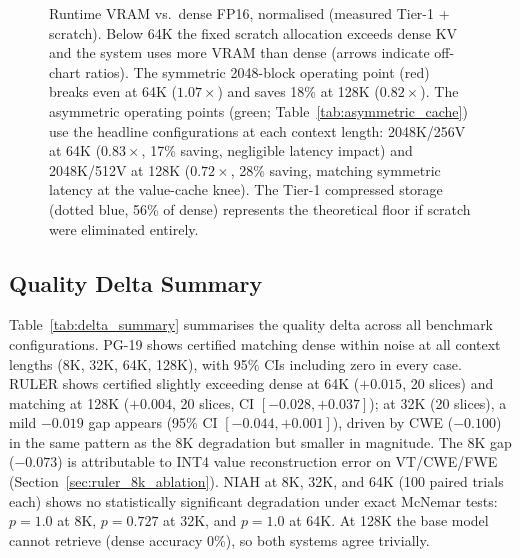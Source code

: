 \documentclass[11pt,a4paper]{article}
\theoremstyle{definition}
\theoremstyle{remark}
\begin{document}
\begin{figure}[H]
\caption{Runtime VRAM vs.\ dense FP16, normalised (measured Tier-1 + scratch).  Below 64K the fixed scratch allocation exceeds dense KV and the system uses more VRAM than dense (arrows indicate off-chart ratios).  The symmetric 2048-block operating point (red) breaks even at 64K ($1.07\times$) and saves 18\% at 128K ($0.82\times$).  The asymmetric operating points (green; Table~\ref{tab:asymmetric_cache}) use the headline configurations at each context length: 2048K/256V at 64K ($0.83\times$, 17\% saving, negligible latency impact) and 2048K/512V at 128K ($0.72\times$, 28\% saving, matching symmetric latency at the value-cache knee).  The Tier-1 compressed storage (dotted blue, 56\% of dense) represents the theoretical floor if scratch were eliminated entirely.}
\label{fig:vram_scaling}
\end{figure}

\subsection{Quality Delta Summary}

Table~\ref{tab:delta_summary} summarises the quality delta across all benchmark configurations.  PG-19 shows certified matching dense within noise at all context lengths (8K, 32K, 64K, 128K), with 95\% CIs including zero in every case.  RULER shows certified slightly exceeding dense at 64K ($+0.015$, 20 slices) and matching at 128K ($+0.004$, 20 slices, CI $[-0.028, +0.037]$); at 32K (20 slices), a mild $-0.019$ gap appears (95\% CI $[-0.044, +0.001]$), driven by CWE ($-0.100$) in the same pattern as the 8K degradation but smaller in magnitude.  The 8K gap ($-0.073$) is attributable to INT4 value reconstruction error on VT/CWE/FWE (Section~\ref{sec:ruler_8k_ablation}).  NIAH at 8K, 32K, and 64K (100 paired trials each) shows no statistically significant degradation under exact McNemar tests: $p{=}1.0$ at 8K, $p{=}0.727$ at 32K, and $p{=}1.0$ at 64K.  At 128K the base model cannot retrieve (dense accuracy 0\%), so both systems agree trivially.
\end{document}
